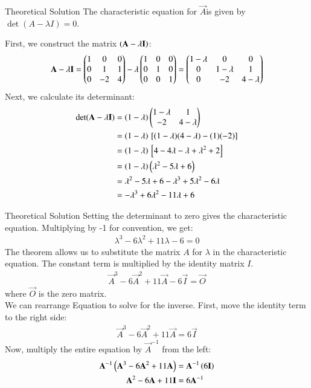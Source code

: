 \documentclass{beamer}
\begin{document}
\begin{frame}{Theoretical Solution}
The characteristic equation for $\vec{A}$is given by $\det(A - \lambda I) = 0$.

First, we construct the matrix $\left(\mathbf{A} - \lambda \mathbf{I}\right)$:
\begin{align}
\mathbf{A} - \lambda \mathbf{I} = \begin{pmatrix} 1 & 0 & 0 \\ 0 & 1 & 1 \\ 0 & -2 & 4 \end{pmatrix} - \lambda \begin{pmatrix} 1 & 0 & 0 \\ 0 & 1 & 0 \\ 0 & 0 & 1 \end{pmatrix} = \begin{pmatrix} 1-\lambda & 0 & 0 \\ 0 & 1-\lambda & 1 \\ 0 & -2 & 4-\lambda \end{pmatrix}
\end{align}
Next, we calculate its determinant:
\begin{align*}
\det(\mathbf{A} - \lambda \mathbf{I}) &= \left(1-\lambda\right) \begin{pmatrix} 1-\lambda & 1 \\ -2 & 4-\lambda \end{pmatrix} \\
&= \left(1-\lambda\right) {}\left[(1-\lambda)(4-\lambda) - (1)(-2) \right] \\
&= \left(1-\lambda\right) {}\left[ 4 - 4\lambda - \lambda + \lambda^2 + 2 \right] \\
&= \left(1-\lambda\right) \left( \lambda^2 - 5\lambda + 6 \right) \\
&= \lambda^2 - 5\lambda + 6 - \lambda^3 + 5\lambda^2 - 6\lambda \\
&= -\lambda^3 + 6\lambda^2 - 11\lambda + 6
\end{align*}
\end{frame}
\begin{frame}{Theoretical Solution}
Setting the determinant to zero gives the characteristic equation. Multiplying by -1 for convention, we get:
\begin{align}
\lambda^3 - 6\lambda^2 + 11\lambda - 6 = 0
\end{align}
The theorem allows us to substitute the matrix $A$ for $\lambda$ in the characteristic equation. The constant term is multiplied by the identity matrix $I$.
\begin{align}
\vec{A}^3 - 6\vec{A}^2 + 11\vec{A} - 6\vec{I} = \vec{O}
\end{align}
where $\vec{O}$ is the zero matrix.\\
We can rearrange Equation  to solve for the inverse. First, move the identity term to the right side:
\begin{align}
\vec{A}^3 - 6\vec{A}^2 + 11\vec{A} = 6\vec{I}
\end{align}
Now, multiply the entire equation by $\vec{A}^{-1}$ from the left:
\begin{align*}
\mathbf{A}^{-1}\left(\mathbf{A}^3 - 6\mathbf{A}^2 + 11\mathbf{A}\right) &= \mathbf{A}^{-1}\left(6\mathbf{I}\right) \\
\mathbf{A}^2 - 6\mathbf{A} + 11\mathbf{I} &= 6\mathbf{A}^{-1}
\end{align*}
\end{frame}
\end{document}
